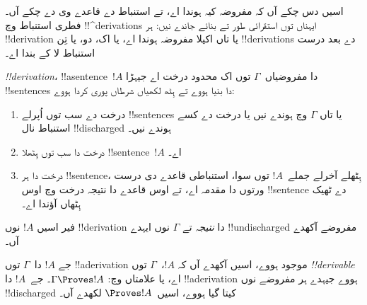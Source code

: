 \documentclass[../../../include/open-logic-section]{subfiles}
\begin{document}
      {}
      {}


\begin{explain}
اسیں دس چکے آں کہ مفروضہ کیہ ہوندا اے، تے استنباط دے قاعدے وی
دے چکے آں۔ فطری استنباط وچ !!^{derivation}s ایہناں توں
استقرائی طور تے بنائے جاندے نیں: ہر !!{derivation} یا تاں اکیلا
مفروضہ ہوندا اے، یا اک، دو، یا تِن !!{derivation}s دے بعد
درست استنباط لا کے بندا اے۔
\end{explain}

\begin{defn}[!!^{derivation}]
 \emph{!!{derivation}}، !!a{sentence}~$!A$ دا
مفروضیاں~$\Gamma$ توں اک محدود درخت اے جیہڑا !!{sentence}s دا
بنیا ہووے تے ہِٹھ لکھیاں شرطاں پوری کردا ہووے:
\begin{enumerate}
\item درخت دے سب توں اُپرلے !!{sentence}s یا تاں $\Gamma$ وچ ہوندے
  نیں یا درخت دے کسے استنباط نال !!{discharged} ہوندے نیں۔
\item درخت دا سب توں ہِٹھلا !!{sentence}~$!A$ اے۔
\item درخت دا ہر !!{sentence}، ہِٹھلے آخرلے جملے~$!A$ توں سوا،
  استنباطی قاعدے دی درست ورتوں دا مقدمہ اے، تے اوس قاعدے دا نتیجہ
  درخت وچ اوس !!{sentence} دے ٹھیک ہِٹھاں آؤندا اے۔
\end{enumerate}
فیر اسیں $!A$ نوں !!{derivation} دا \emph{نتیجہ} تے $\Gamma$
نوں ایہدے !!{undischarged} مفروضے آکھدے آں۔

جے $!A$ دا~$\Gamma$ توں !!a{derivation} موجود ہووے، اسیں آکھدے
آں کہ $!A$،~$\Gamma$ توں \emph{!!{derivable}} اے، یا علامتاں وچ:
$\Gamma \Proves
!A$۔ جے~$!A$ دا !!a{derivation} ہووے جیہدے ہر مفروضے نوں
!!{discharged} کیتا گیا ہووے، اسیں~$\Proves !A$ لکھدے آں۔
\end{defn}
\end{document}
